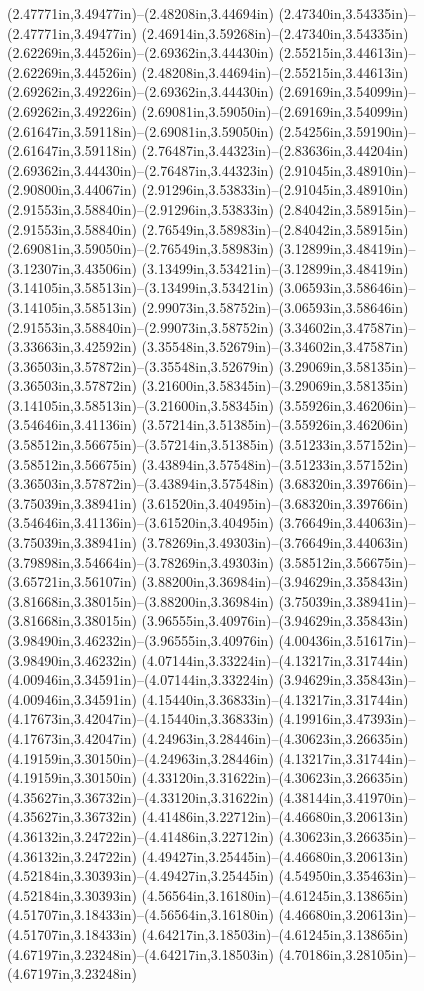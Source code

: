 (2.47771in,3.49477in)--(2.48208in,3.44694in) (2.47340in,3.54335in)--(2.47771in,3.49477in) (2.46914in,3.59268in)--(2.47340in,3.54335in) (2.62269in,3.44526in)--(2.69362in,3.44430in) (2.55215in,3.44613in)--(2.62269in,3.44526in) (2.48208in,3.44694in)--(2.55215in,3.44613in) (2.69262in,3.49226in)--(2.69362in,3.44430in) (2.69169in,3.54099in)--(2.69262in,3.49226in) (2.69081in,3.59050in)--(2.69169in,3.54099in) (2.61647in,3.59118in)--(2.69081in,3.59050in) (2.54256in,3.59190in)--(2.61647in,3.59118in) (2.76487in,3.44323in)--(2.83636in,3.44204in) (2.69362in,3.44430in)--(2.76487in,3.44323in) (2.91045in,3.48910in)--(2.90800in,3.44067in) (2.91296in,3.53833in)--(2.91045in,3.48910in) (2.91553in,3.58840in)--(2.91296in,3.53833in) (2.84042in,3.58915in)--(2.91553in,3.58840in) (2.76549in,3.58983in)--(2.84042in,3.58915in) (2.69081in,3.59050in)--(2.76549in,3.58983in) (3.12899in,3.48419in)--(3.12307in,3.43506in) (3.13499in,3.53421in)--(3.12899in,3.48419in) (3.14105in,3.58513in)--(3.13499in,3.53421in) (3.06593in,3.58646in)--(3.14105in,3.58513in) (2.99073in,3.58752in)--(3.06593in,3.58646in) (2.91553in,3.58840in)--(2.99073in,3.58752in) (3.34602in,3.47587in)--(3.33663in,3.42592in) (3.35548in,3.52679in)--(3.34602in,3.47587in) (3.36503in,3.57872in)--(3.35548in,3.52679in) (3.29069in,3.58135in)--(3.36503in,3.57872in) (3.21600in,3.58345in)--(3.29069in,3.58135in) (3.14105in,3.58513in)--(3.21600in,3.58345in) (3.55926in,3.46206in)--(3.54646in,3.41136in) (3.57214in,3.51385in)--(3.55926in,3.46206in) (3.58512in,3.56675in)--(3.57214in,3.51385in) (3.51233in,3.57152in)--(3.58512in,3.56675in) (3.43894in,3.57548in)--(3.51233in,3.57152in) (3.36503in,3.57872in)--(3.43894in,3.57548in) (3.68320in,3.39766in)--(3.75039in,3.38941in) (3.61520in,3.40495in)--(3.68320in,3.39766in) (3.54646in,3.41136in)--(3.61520in,3.40495in) (3.76649in,3.44063in)--(3.75039in,3.38941in) (3.78269in,3.49303in)--(3.76649in,3.44063in) (3.79898in,3.54664in)--(3.78269in,3.49303in) (3.58512in,3.56675in)--(3.65721in,3.56107in) (3.88200in,3.36984in)--(3.94629in,3.35843in) (3.81668in,3.38015in)--(3.88200in,3.36984in) (3.75039in,3.38941in)--(3.81668in,3.38015in) (3.96555in,3.40976in)--(3.94629in,3.35843in) (3.98490in,3.46232in)--(3.96555in,3.40976in) (4.00436in,3.51617in)--(3.98490in,3.46232in) (4.07144in,3.33224in)--(4.13217in,3.31744in) (4.00946in,3.34591in)--(4.07144in,3.33224in) (3.94629in,3.35843in)--(4.00946in,3.34591in) (4.15440in,3.36833in)--(4.13217in,3.31744in) (4.17673in,3.42047in)--(4.15440in,3.36833in) (4.19916in,3.47393in)--(4.17673in,3.42047in) (4.24963in,3.28446in)--(4.30623in,3.26635in) (4.19159in,3.30150in)--(4.24963in,3.28446in) (4.13217in,3.31744in)--(4.19159in,3.30150in) (4.33120in,3.31622in)--(4.30623in,3.26635in) (4.35627in,3.36732in)--(4.33120in,3.31622in) (4.38144in,3.41970in)--(4.35627in,3.36732in) (4.41486in,3.22712in)--(4.46680in,3.20613in) (4.36132in,3.24722in)--(4.41486in,3.22712in) (4.30623in,3.26635in)--(4.36132in,3.24722in) (4.49427in,3.25445in)--(4.46680in,3.20613in) (4.52184in,3.30393in)--(4.49427in,3.25445in) (4.54950in,3.35463in)--(4.52184in,3.30393in) (4.56564in,3.16180in)--(4.61245in,3.13865in) (4.51707in,3.18433in)--(4.56564in,3.16180in) (4.46680in,3.20613in)--(4.51707in,3.18433in) (4.64217in,3.18503in)--(4.61245in,3.13865in) (4.67197in,3.23248in)--(4.64217in,3.18503in) (4.70186in,3.28105in)--(4.67197in,3.23248in) 